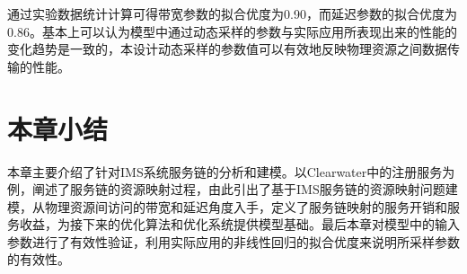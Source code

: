 通过实验数据统计计算可得带宽参数的拟合优度为0.90，而延迟参数的拟合优度为0.86。基本上可以认为模型中通过动态采样的参数与实际应用所表现出来的性能的变化趋势是一致的，本设计动态采样的参数值可以有效地反映物理资源之间数据传输的性能。

\section{本章小结}
本章主要介绍了针对IMS系统服务链的分析和建模。以Clearwater中的注册服务为例，阐述了服务链的资源映射过程，由此引出了基于IMS服务链的资源映射问题建模，从物理资源间访问的带宽和延迟角度入手，定义了服务链映射的服务开销和服务收益，为接下来的优化算法和优化系统提供模型基础。最后本章对模型中的输入参数进行了有效性验证，利用实际应用的非线性回归的拟合优度来说明所采样参数的有效性。